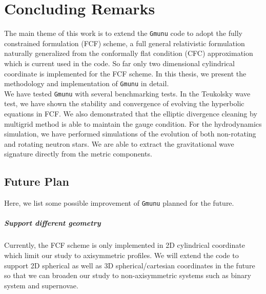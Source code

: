 
\chapter{Concluding Remarks}  %

\ifpdf
    \graphicspath{{Chapter5/Figs/PDF/}{Chapter5/Figs/}}
\else
    \graphicspath{{Chapter5/Figs/}}
\fi
The main theme of this work is to extend the \texttt{Gmunu} code to adopt the
fully constrained formulation (FCF) scheme,
a full general relativistic formulation naturally generalized from the conformally flat condition (CFC) approximation
which is current used in the code.
So far only two dimensional cylindrical coordinate is implemented for the FCF scheme.
In this thesis, we present the methodology and implementation of \texttt{Gmunu} in detail.\\
We have tested \texttt{Gmunu} with several benchmarking tests.
In the Teukolsky wave test, we have shown the stability and convergence of evolving the hyperbolic equations in FCF.
We also demonstrated that the elliptic divergence cleaning by multigrid method is able to maintain the gauge condition.
For the hydrodynamics simulation,
we have performed simulations of the evolution of both non-rotating and rotating neutron stars.
We are able to extract the gravitational wave signature directly from the metric components.

\section*{Future Plan}
Here, we list some possible improvement of \texttt{Gmunu} planned for the future.

\paragraph{Support different geometry}
Currently, the FCF scheme is only implemented in 2D cylindrical coordinate
which limit our study to axisymmetric profiles.
We will extend the code to support 2D spherical
as well as 3D spherical/cartesian coordinates in the future
so that we can broaden our study to non-axisymmetric systems
such as binary system and supernovae.

